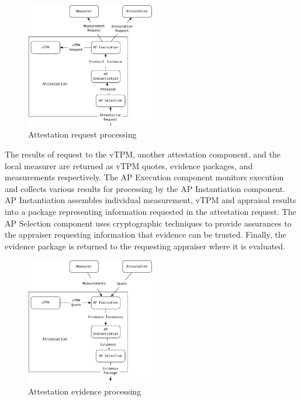 \documentclass[10pt]{article}
\begin{document}
\begin{figure}[hbtp]
  \centering
  \includegraphics[width=0.50\textwidth]{figures/attestation-1.pdf}
  \caption{Attestation request processing}
  \label{fig:attestation-1}
\end{figure}

The results of request to the vTPM, another attestation component, and
the local measurer are returned as vTPM quotes, evidence packages, and
measurements respectively.  The AP Execution component monitors
execution and collects various results for processing by the AP
Instantiation component.  AP Instantiation assembles individual
measurement, vTPM and appraisal results into a package representing
information requested in the attestation request.  The AP Selection
component uses cryptographic techniques to provide assurances to the
appraiser requesting information that evidence can be trusted.
Finally, the evidence package is returned to the requesting appraiser
where it is evaluated.

\begin{figure}[hbtp]
  \centering
  \includegraphics[width=0.50\textwidth]{figures/attestation-2.pdf}
  \caption{Attestation evidence processing}
  \label{fig:attestation-2}
\end{figure}
\end{document}
